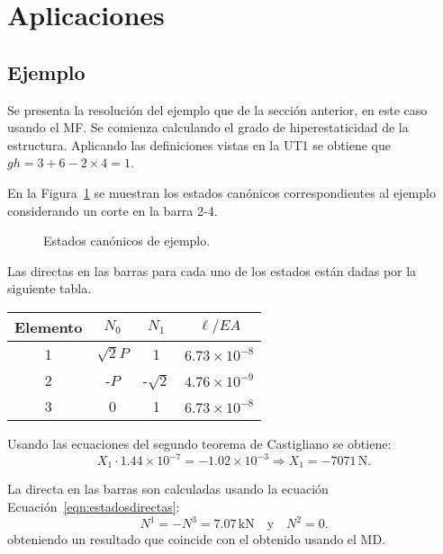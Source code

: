 \section{Aplicaciones}
\subsection{Ejemplo}

Se presenta la resolución del ejemplo que de la sección anterior, en este caso usando el MF. %
%
Se comienza calculando el grado de hiperestaticidad de la estructura. Aplicando las definiciones vistas en la UT1 se obtiene que $gh= 3 + 6 - 2 \times 4 = 1$.

En la Figura~\ref{fig:hipereje} se muestran los estados canónicos correspondientes al ejemplo considerando un corte en la barra 2-4.
%
\begin{figure}[htb]
\centering
\def\svgwidth{\textwidth}

\caption{Estados canónicos de ejemplo.}
\label{fig:hipereje}
\end{figure}

Las directas en las barras para cada uno de los estados están dadas por la siguiente tabla.
	\begin{center}
		\begin{tabular}{cccc}
\hline
			Elemento & $N_0$ &  $N_1$ & $ \ell / E A$ \\
			\hline
			1 & $\sqrt{2} P$ & 1 & $6.73 \times 10^{-8}$ \\
			2 & -$P$ & -$\sqrt{2}$ & $4.76 \times 10^{-9}$ \\
			3 & 0 &  1 & $ 6.73 \times 10^{-8}$ \\
			\hline
		\end{tabular}
	\end{center}

Usando las ecuaciones del segundo teorema de Castigliano  se obtiene:
%
\begin{equation}
X_1 \cdot  1.44 \times 10^{-7} = -1.02 \times 10^{-3} \Rightarrow \boxed{ X_1 = -7071 \, \text{N} }.
\end{equation}

La directa en las barras son calculadas usando la ecuación Ecuación~\eqref{eqn:estadosdirectas}:
%
\begin{equation}
N^1 = - N^3 =7.07 \, \text{kN} \quad \text{y} \quad N^2 = 0.
\end{equation}
obteniendo un resultado que coincide con el obtenido usando el MD.



